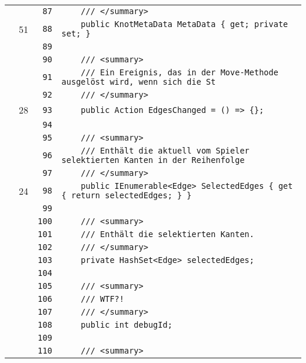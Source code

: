 \documentclass[a4paper,10pt]{article}
\begin{document}
\begin{longtable}[l]{lrrl}
\cellcolor{gray} &  & \verb~87~ & \verb~    /// </summary>~\\
\cellcolor{green} & 51 & \verb~88~ & \verb~    public KnotMetaData MetaData { get; private set; }~\\
\cellcolor{gray} &  & \verb~89~ & \verb~~\\
\cellcolor{gray} &  & \verb~90~ & \verb~    /// <summary>~\\
\cellcolor{gray} &  & \verb~91~ & \verb~    /// Ein Ereignis, das in der Move-Methode ausgelöst wird, wenn sich die St~\\
\cellcolor{gray} &  & \verb~92~ & \verb~    /// </summary>~\\
\cellcolor{green} & 28 & \verb~93~ & \verb~    public Action EdgesChanged = () => {};~\\
\cellcolor{gray} &  & \verb~94~ & \verb~~\\
\cellcolor{gray} &  & \verb~95~ & \verb~    /// <summary>~\\
\cellcolor{gray} &  & \verb~96~ & \verb~    /// Enthält die aktuell vom Spieler selektierten Kanten in der Reihenfolge~\\
\cellcolor{gray} &  & \verb~97~ & \verb~    /// </summary>~\\
\cellcolor{green} & 24 & \verb~98~ & \verb~    public IEnumerable<Edge> SelectedEdges { get { return selectedEdges; } }~\\
\cellcolor{gray} &  & \verb~99~ & \verb~~\\
\cellcolor{gray} &  & \verb~100~ & \verb~    /// <summary>~\\
\cellcolor{gray} &  & \verb~101~ & \verb~    /// Enthält die selektierten Kanten.~\\
\cellcolor{gray} &  & \verb~102~ & \verb~    /// </summary>~\\
\cellcolor{gray} &  & \verb~103~ & \verb~    private HashSet<Edge> selectedEdges;~\\
\cellcolor{gray} &  & \verb~104~ & \verb~~\\
\cellcolor{gray} &  & \verb~105~ & \verb~    /// <summary>~\\
\cellcolor{gray} &  & \verb~106~ & \verb~    /// WTF?!~\\
\cellcolor{gray} &  & \verb~107~ & \verb~    /// </summary>~\\
\cellcolor{gray} &  & \verb~108~ & \verb~    public int debugId;~\\
\cellcolor{gray} &  & \verb~109~ & \verb~~\\
\cellcolor{gray} &  & \verb~110~ & \verb~    /// <summary>~\\

\end{longtable}
\end{document}
